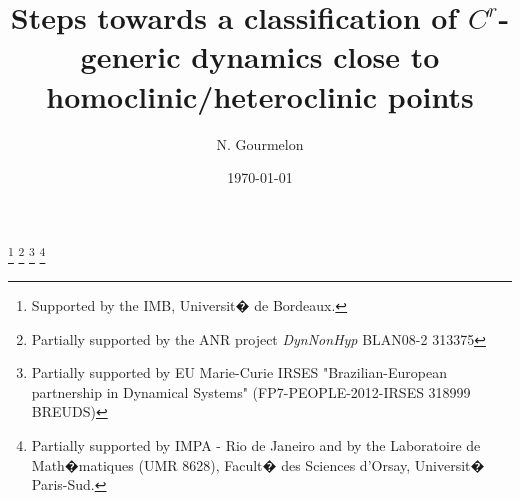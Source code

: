 \documentclass[11pt, a4paper]{amsart}
\theoremstyle{plain}
\theoremstyle{definition}
\theoremstyle{remark}
\numberwithin{equation}{section}         %
\begin{document}
\title[$C^r$-generic dynamics close to homoclinic/heteroclinic points]{Steps towards a classification of $C^r$-generic dynamics close to homoclinic/heteroclinic points}
\author[N. Gourmelon]{N. Gourmelon}
\address{IMB. UMR 5251. \rm Universit\'e Bordeaux 1, 33405 Talence, France}
\thanks{Supported by the IMB, Universit� de Bordeaux.}
\thanks{Partially supported by the ANR project \emph{DynNonHyp} BLAN08-2 313375}
\thanks{Partially supported by EU Marie-Curie IRSES "Brazilian-European partnership in Dynamical 
Systems" (FP7-PEOPLE-2012-IRSES 318999 BREUDS)}
\thanks{Partially supported by IMPA - Rio de Janeiro and by the Laboratoire de Math�matiques (UMR 8628), Facult� des Sciences d'Orsay, Universit� Paris-Sud.}


\date\today
\end{document}
